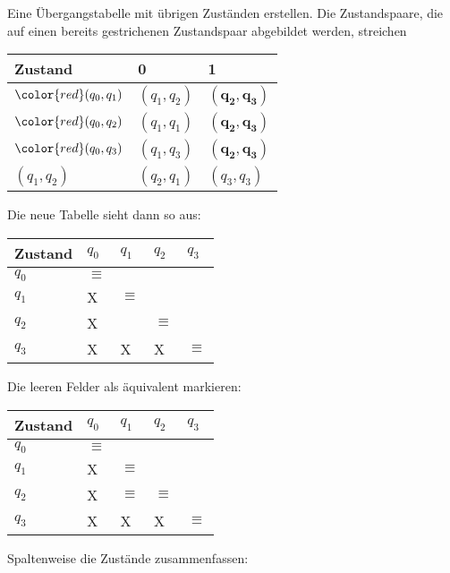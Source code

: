 Eine Übergangstabelle mit übrigen Zuständen erstellen. Die Zustandspaare, die auf einen bereits gestrichenen Zustandspaar abgebildet werden, streichen
\begin{table}[H]
    \centering
    \begin{tabular}{|l|l|l|}
    \hline
    Zustand      & 0           & 1           \\ \hline
    $\color{red}(q_0,q_1)$  & $(q_1,q_2)$ & $\mathbf{(q_2,q_3)}$ \\ \hline
    $\color{red}(q_0,q_2)$  & $(q_1,q_1)$ & $\mathbf{(q_2,q_3)}$ \\ \hline
    $\color{red}(q_0,q_3)$  & $(q_1,q_3)$ & $\mathbf{(q_2,q_3)}$ \\ \hline
    $(q_1,q_2)$  & $(q_2,q_1)$ & $(q_3,q_3)$ \\ \hline
    \end{tabular}
\end{table}
Die neue Tabelle sieht dann so aus:
\begin{table}[H]
    \centering
    \begin{tabular}{|l|l|l|l|l|}
    \hline
    Zustand    & $q_0$    &     $q_1$       & $q_2$    & $q_3$    \\ \hline
    $q_0$      & $\equiv$ &                 &          &          \\ \hline
    $q_1$      &    X     &     $\equiv$    &          &          \\ \hline
    $q_2$      &    X     &                 & $\equiv$ &          \\ \hline
    $q_3$      &    X     &     X           &    X     & $\equiv$ \\ \hline
    \end{tabular}
\end{table}
Die leeren Felder als äquivalent markieren:
\begin{table}[H]
    \centering
    \begin{tabular}{|l|l|l|l|l|}
    \hline
    Zustand    & $q_0$    &     $q_1$       & $q_2$    & $q_3$    \\ \hline
    $q_0$      & $\equiv$ &                 &          &          \\ \hline
    $q_1$      &    X     &     $\equiv$    &          &          \\ \hline
    $q_2$      &    X     &     $\equiv$    & $\equiv$ &          \\ \hline
    $q_3$      &    X     &     X           &    X     & $\equiv$ \\ \hline
    \end{tabular}
\end{table}
Spaltenweise die Zustände zusammenfassen:
\begin{figure}[H]
    \centering
    \begin{transitiongraph}[fa]
    \end{transitiongraph}
\end{figure}